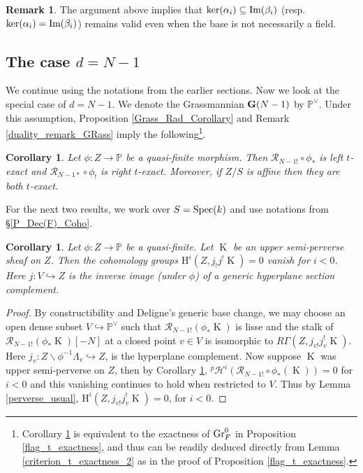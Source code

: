 \documentclass[12pt, reqno]{amsart}
\theoremstyle{plain}
\newtheorem{cor}[thm]{\bf Corollary}
\theoremstyle{definition}
\newtheorem{rem}[thm]{\bf Remark}
\theoremstyle{definition}
\newcommand{\bbP}{{\mathbb P}}
\newcommand{\bG}{{\bf G}}
\newcommand{\cR}{{\mathcal R}}
\newcommand{\cpH}{{^p\mathcal{H}}}
\newcommand{\Spec}{{\rm Spec}}
\DeclareMathOperator{\KK}{K}
\begin{document}
\begin{rem}\label{main_thm_remark}
The argument above implies that $\textup{ker}(\alpha_i)\subseteq\textup{Im}(\beta_i)$ (resp. $\textup{ker}(\alpha_i)=\textup{Im}(\beta_i)$) remains valid even when the base is not necessarily a field.
\end{rem}
\subsection{The case $d=N-1$}\label{d_N-1}

We continue using the notations from the earlier sections. Now we look at the special case of $d=N-1$. We denote the Grassmannian $\bG(N-1)$ by $\bbP^{\vee}$. Under this assumption, Proposition \ref{Grass_Rad_Corollary} and Remark \ref{duality_remark_GRass} imply the following\footnote{Corollary \ref{SWL_Rad} is equivalent to the exactness of $\textup{Gr}_F^0$ in Proposition \ref{flag_t_exactness}, and thus can be readily deduced directly from Lemma \ref{criterion_t_exactness_2} as in the proof of Proposition \ref{flag_t_exactness}.}.

\begin{cor}\label{SWL_Rad}
Let $\phi \colon Z \to \bbP$ be a quasi-finite morphism. Then $\cR_{N-1!} \circ \phi_*$ is left $t$-exact and  $\cR_{N-1*} \circ \phi_!$ is right $t$-exact. Moreover, if $Z/S$ is affine then they are both $t$-exact.
\end{cor}

For the next two results, we work over $S=\Spec(k)$ and use notations from \S \ref{P_Dec(F)_Coho}.

\begin{cor}\label{Deligne_WL}
    Let $\phi: Z \to \bbP$ be a quasi-finite. Let $\KK$ be an upper semi-perverse sheaf on $Z$. Then the cohomology groups $\mathrm{H}^i(Z,j_{!}j^!\KK)=0$ vanish for $i < 0$. Here $j \colon V \hookrightarrow Z$ is the inverse image (under $\phi$) of a generic hyperplane section complement. 
\end{cor}

\begin{proof}
    By constructibility and Deligne's generic base change, we may choose an open dense subset $V \hookrightarrow \bbP^{\vee}$ such that $\cR_{N-1!}(\phi_*\KK)$ is lisse and the stalk of $\cR_{N-1!}(\phi_*\KK)[-N]$ at a closed point $v \in V$ is isomorphic to $R\Gamma(Z,j_{v!}j_v^!\KK)$. Here $j_v \colon Z \backslash \phi^{-1}\Lambda_v \hookrightarrow Z$, is the hyperplane complement. Now suppose $\KK$ was upper semi-perverse on $Z$, then by Corollary \ref{SWL_Rad}, $\cpH^{i}(\cR_{N-1!}\circ\phi_*(\KK))=0$ for $i <0 $ and this vanishing continues to hold when restricted to $V$. Thus by Lemma \ref{perverse_usual}, $\mathrm{H}^i(Z,j_{v!}j_v^!\KK)=0$, for $i <0$. 
\end{proof}
\end{document}
